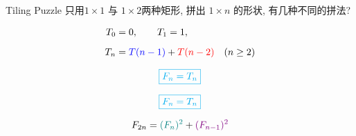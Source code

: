 \begin{frame}{}
  \begin{exampleblock}{Tiling Puzzle}
    只用$1 \times 1$ 与 $1 \times 2$两种矩形,
    拼出 $1 \times n$ 的形状, 有几种不同的拼法?
  \end{exampleblock}

  \pause
  \vspace{0.30cm}

  \pause

  \pause
  \vspace{-0.30cm}
  \begin{align*}
    T_{0} &= 0, \qquad T_{1} = 1, \\[6pt]
    T_{n} &= \textcolor{blue}{T(n-1)} + \textcolor{red}{T(n-2)} \quad (n \ge 2)
  \end{align*}

  \pause
  \[
    \textcolor{cyan}{\boxed{F_{n} = T_{n}}}
  \]
\end{frame}

\begin{frame}{}
  \[
    \textcolor{cyan}{\boxed{F_{n} = T_{n}}}
  \]

  \pause
  \vspace{0.50cm}
  \[
    F_{2n} = \textcolor{teal}{(F_{n})^{2}} + \textcolor{violet}{(F_{n-1})^{2}}
  \]

  \pause
  \vspace{0.50cm}
\end{frame}
